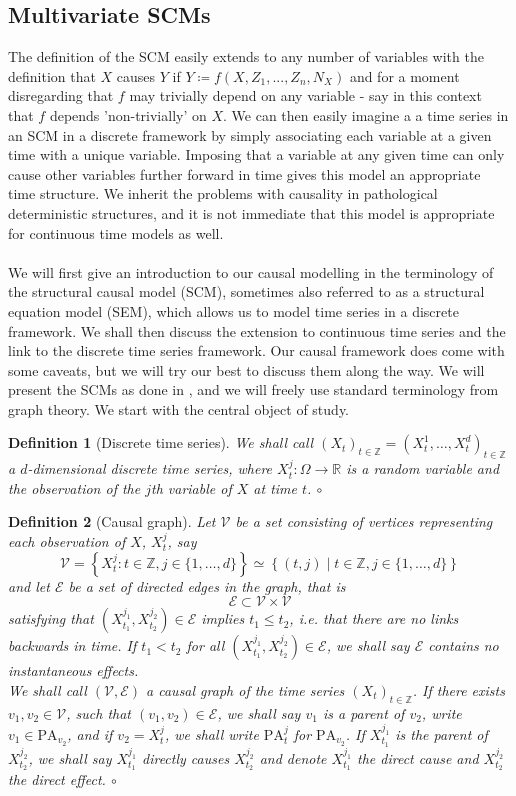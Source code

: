 \documentclass[11pt, a4paper]{memoir}
\newcommand{\coloremph}[1]{\textcolor{emphcolor}{\emph{#1}}}
\theoremstyle{break}
\theoremstyle{break}
\newtheorem{innerdefn}{Definition}
\newenvironment{defn}
  {\begin{innerdefn}}
  {\ensuremath{\circ}\end{innerdefn}}
\theoremstyle{nonumberplain}
\newcommand{\mZ}{\mathbb{Z}}
\newcommand{\mR}{\mathbb{R}}
\begin{document}
\subsection{Multivariate SCMs}
The definition of the SCM easily extends to any number of variables with the definition that $X$ causes $Y$ if $Y\coloneqq f(X,Z_1,...,Z_n,N_X)$ and for a moment disregarding that $f$ may trivially depend on any variable - say in this context that $f$ depends 'non-trivially' on $X$. We can then easily imagine a a time series in an SCM in a discrete framework by simply associating each variable at a given time with a unique variable. Imposing that a variable at any given time can only cause other variables further forward in time gives this model an appropriate time structure. We inherit the problems with causality in pathological deterministic structures, and it is not immediate that this model is appropriate for continuous time models as well.\\\\
We will first give an introduction to our causal modelling in the terminology of the structural causal model (SCM), sometimes also referred to as a structural equation model (SEM),  which allows us to model time series in a discrete framework. We shall then discuss the extension to continuous time series and the link to the discrete time series framework. Our causal framework does come with some caveats, but we will try our best to discuss them along the way. We will present the SCMs as done in \cite{Peters}, and we will freely use standard terminology from graph theory. We start with the central object of study.
\begin{defn}[Discrete time series]
We shall call $(X_t)_{t\in \mZ}=(X_t^{1},\ldots,X_{t}^d)_{t\in \mZ}$ a \emph{$d$-dimensional discrete time series}, where $X_t^j:\Omega\to \mR$ is a random variable and the observation of the $j$th variable of $X$ at time $t$.
\end{defn}
\begin{defn}[Causal graph]
Let $\mathcal{V}$ be a set consisting of vertices representing each observation of $X$, $X_t^j$, say $$\mathcal{V}=\left\{X_t^j: t\in \mZ,j\in\{1,\ldots,d\}\right\}\simeq \left\{(t,j)\mid t\in \mZ, j\in \{1,\ldots,d\}\right\}$$ and let $\mathcal{E}$ be a set of directed edges in the graph, that is 
$$\mathcal{E}\subset \mathcal{V}\times \mathcal{V}$$
satisfying that $(X_{t_1}^{j_1},X_{t_2}^{j_2})\in \mathcal{E}$ implies $t_1\leqslant t_2$, i.e. that there are no links backwards in time. If $t_1<t_2$ for all $(X_{t_1}^{j_1},X_{t_2}^{j_2})\in \mathcal{E}$, we shall say $\mathcal{E}$ contains no \coloremph{instantaneous effects}.\\
We shall call $(\mathcal{V}, \mathcal{E})$ a \coloremph{causal graph} of the time series $(X_t)_{t\in \mZ}$. If there exists $v_1,v_2\in \mathcal{V}$, such that $(v_1,v_2)\in \mathcal{E}$, we shall say $v_1$ is a \emph{parent} of $v_2$, write $v_1\in \text{PA}_{v_2}$, and if $v_2=X_t^j$, we shall write $\text{PA}_{t}^j$ for $\text{PA}_{v_2}$. If $X_{t_1}^{j_1}$ is the parent of $X_{t_2}^{j_2}$, we shall say $X_{t_1}^{j_1}$ \emph{directly causes} $X_{t_2}^{j_2}$ and denote $X_{t_1}^{j_1}$ the \emph{direct cause} and $X_{t_2}^{j_2}$ the \emph{direct effect}.
\end{defn}
\end{document}
